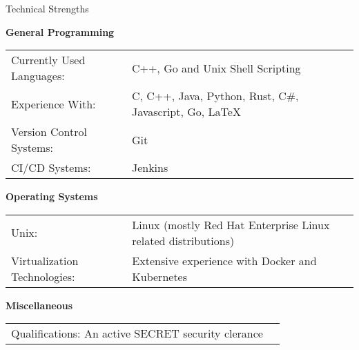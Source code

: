 \documentclass{resume} %
\newcommand{\btab}[2]{
  \bgroup
  \def\arraystretch{#1}
  \begin{tabular}{#2}
}
\newcommand{\etab}{
  \end{tabular} \smallskip
  \egroup
}
\begin{document}
\begin{rSection}{Technical Strengths}

  {\bf General Programming}

  \btab{1.1}{ l l }
  Currently Used Languages: & C++, Go and Unix Shell Scripting \\
  Experience With: & C, C++, Java, Python, Rust, C\#, Javascript, Go, \LaTeX \\
  Version Control Systems: & Git \\
  CI/CD Systems: & Jenkins \\
  \etab

  {\bf Operating Systems}

  \btab{1.1}{ l l }
  Unix: & Linux (mostly Red Hat Enterprise Linux related distributions) \\
  Virtualization Technologies: & Extensive experience with Docker and Kubernetes \\
  \etab

  {\bf Miscellaneous}

  \btab{1.1}{ l l }
  Qualifications: An active SECRET security clerance
  \etab

\end{rSection}
\end{document}
